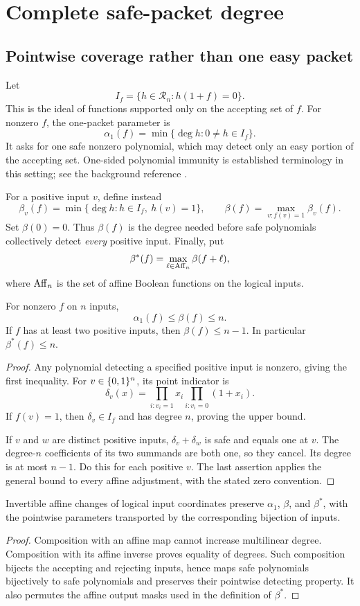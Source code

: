 \chapter{Complete safe-packet degree}
\label{c:ch:degree}
\section{Pointwise coverage rather than one easy packet}
Let
\[
 I_f=\{h\in\mathcal R_n:h(1+f)=0\}.
\]
This is the ideal of functions supported only on the accepting set of $f$. For nonzero $f$, the one-packet parameter is
\[
 \alpha_1(f)=\min\{\deg h:0\ne h\in I_f\}.
\]
It asks for one safe nonzero polynomial, which may detect only an easy portion of the accepting set. One-sided polynomial immunity is established terminology in this setting; see the background reference \cite{c:beckli}.

For a positive input $v$, define instead
\[
 \beta_v(f)=\min\{\deg h:h\in I_f,\ h(v)=1\},\qquad
 \beta(f)=\max_{v:f(v)=1}\beta_v(f).
\]
Set $\beta(0)=0$. Thus $\beta(f)$ is the degree needed before safe polynomials collectively detect \emph{every} positive input. Finally, put
\[
 \beta^*(f)=\max_{\ell\in\operatorname{Aff}_n}\beta(f+\ell),
\]
where $\operatorname{Aff}_n$ is the set of affine Boolean functions on the logical inputs.

\begin{proposition}\label{c:prop:beta-bounds}
For nonzero $f$ on $n$ inputs,
\[
 \alpha_1(f)\le\beta(f)\le n.
\]
If $f$ has at least two positive inputs, then $\beta(f)\le n-1$. In particular $\beta^*(f)\le n$.
\end{proposition}
\begin{proof}
Any polynomial detecting a specified positive input is nonzero, giving the first inequality. For $v\in\{0,1\}^n$, its point indicator is
\[
 \delta_v(x)=\prod_{i:v_i=1}x_i\prod_{i:v_i=0}(1+x_i).
\]
If $f(v)=1$, then $\delta_v\in I_f$ and has degree $n$, proving the upper bound.

If $v$ and $w$ are distinct positive inputs, $\delta_v+\delta_w$ is safe and equals one at $v$. The degree-$n$ coefficients of its two summands are both one, so they cancel. Its degree is at most $n-1$. Do this for each positive $v$. The last assertion applies the general bound to every affine adjustment, with the stated zero convention.
\end{proof}

\begin{proposition}\label{c:prop:affine-invariance}
Invertible affine changes of logical input coordinates preserve $\alpha_1$, $\beta$, and $\beta^*$, with the pointwise parameters transported by the corresponding bijection of inputs.
\end{proposition}
\begin{proof}
Composition with an affine map cannot increase multilinear degree. Composition with its affine inverse proves equality of degrees. Such composition bijects the accepting and rejecting inputs, hence maps safe polynomials bijectively to safe polynomials and preserves their pointwise detecting property. It also permutes the affine output masks used in the definition of $\beta^*$.
\end{proof}

